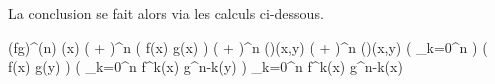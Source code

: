 La conclusion se fait alors via les calculs ci-dessous.

\begin{stepcalc}[style=sar]
	(fg)^{(n)} (x)
\explnext{}
    \big(  +  \big)^n \big( f(x) g(x) \big)
\explnext{}
    \big(  +  \big)^n \circ \Lambda(\pi)(x,y)
    \Lambda \circ \big(  +  \big)^n (\pi)(x,y)
\explnext{}
    \Lambda \circ \big( \dsum_{k=0}^n \combi[n][k]  \circ {} \big) \big( f(x) g(y) \big)
%
%
\explnext{}
    \Lambda \circ \big( \dsum_{k=0}^n \combi[n][k] f^k(x) g^{n-k}(y) \big)
\explnext{}
	\dsum_{k=0}^n \combi[n][k] f^k(x) g^{n-k}(x)
\end{stepcalc}